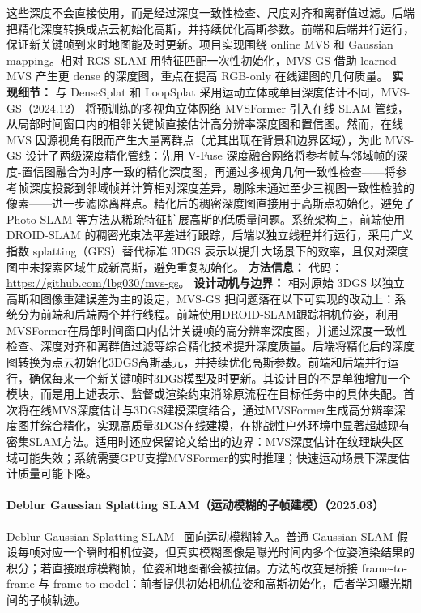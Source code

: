 这些深度不会直接使用，而是经过深度一致性检查、尺度对齐和离群值过滤。后端把精化深度转换成点云初始化高斯，并持续优化高斯参数。前端和后端并行运行，保证新关键帧到来时地图能及时更新。项目实现围绕 online MVS 和 Gaussian mapping。相对 RGS-SLAM 用特征匹配一次性初始化，MVS-GS 借助 learned MVS 产生更 dense 的深度图，重点在提高 RGB-only 在线建图的几何质量。
\textbf{实现细节：} 与 DenseSplat 和 LoopSplat 采用运动立体或单目深度估计不同，MVS-GS（2024.12） 将预训练的多视角立体网络 MVSFormer 引入在线 SLAM 管线，从局部时间窗口内的相邻关键帧直接估计高分辨率深度图和置信图。然而，在线 MVS 因源视角有限而产生大量离群点（尤其出现在背景和边界区域），为此 MVS-GS 设计了两级深度精化管线：先用 V-Fuse 深度融合网络将参考帧与邻域帧的深度-置信图融合为时序一致的精化深度图，再通过多视角几何一致性检查——将参考帧深度投影到邻域帧并计算相对深度差异，剔除未通过至少三视图一致性检验的像素——进一步滤除离群点。精化后的稠密深度图直接用于高斯点初始化，避免了 Photo-SLAM 等方法从稀疏特征扩展高斯的低质量问题。系统架构上，前端使用 DROID-SLAM 的稠密光束法平差进行跟踪，后端以独立线程并行运行，采用广义指数 splatting（GES）替代标准 3DGS 表示以提升大场景下的效率，且仅对深度图中未探索区域生成新高斯，避免重复初始化。
\textbf{方法信息：} 代码：\url{https://github.com/lbg030/mvs-gs}。
\textbf{设计动机与边界：} 相对原始 3DGS 以独立高斯和图像重建误差为主的设定，MVS-GS 把问题落在以下可实现的改动上：系统分为前端和后端两个并行线程。前端使用DROID-SLAM跟踪相机位姿，利用MVSFormer在局部时间窗口内估计关键帧的高分辨率深度图，并通过深度一致性检查、深度对齐和离群值过滤等综合精化技术提升深度质量。后端将精化后的深度图转换为点云初始化3DGS高斯基元，并持续优化高斯参数。前端和后端并行运行，确保每来一个新关键帧时3DGS模型及时更新。其设计目的不是单独增加一个模块，而是用上述表示、监督或渲染约束消除原流程在目标任务中的具体失配。首次将在线MVS深度估计与3DGS建模深度结合，通过MVSFormer生成高分辨率深度图并综合精化，实现高质量3DGS在线建模，在挑战性户外环境中显著超越现有密集SLAM方法。适用时还应保留论文给出的边界：MVS深度估计在纹理缺失区域可能失效；系统需要GPU支撑MVSFormer的实时推理；快速运动场景下深度估计质量可能下降。
\paragraph{Deblur Gaussian Splatting SLAM（运动模糊的子帧建模）（2025.03）}
Deblur Gaussian Splatting SLAM~\cite{2503_12572} 面向运动模糊输入。普通 Gaussian SLAM 假设每帧对应一个瞬时相机位姿，但真实模糊图像是曝光时间内多个位姿渲染结果的积分；若直接跟踪模糊帧，位姿和地图都会被拉偏。方法的改变是桥接 frame-to-frame 与 frame-to-model：前者提供初始相机位姿和高斯初始化，后者学习曝光期间的子帧轨迹。

